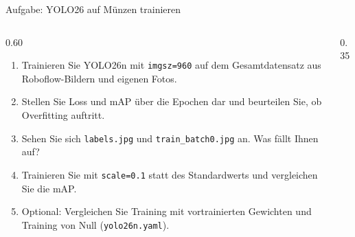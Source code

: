 \begin{frame}{Aufgabe: YOLO26 auf Münzen trainieren}
\footnotesize
\begin{columns}
\begin{column}{0.60\textwidth}
\begin{enumerate}
  \item Trainieren Sie YOLO26n mit \texttt{imgsz=960} auf dem Gesamtdatensatz aus Roboflow-Bildern und eigenen Fotos.
  \item Stellen Sie Loss und mAP über die Epochen dar und beurteilen Sie, ob Overfitting auftritt.
  \item Sehen Sie sich \texttt{labels.jpg} und \texttt{train\_batch0.jpg} an. Was fällt Ihnen auf?
  \item Trainieren Sie mit \texttt{scale=0.1} statt des Standardwerts und vergleichen Sie die mAP.
  \item Optional: Vergleichen Sie Training mit vortrainierten Gewichten und Training von Null (\texttt{yolo26n.yaml}).
\end{enumerate}
\end{column}
\begin{column}{0.35\textwidth}
\centering
{}
\end{column}
\end{columns}
\end{frame}


